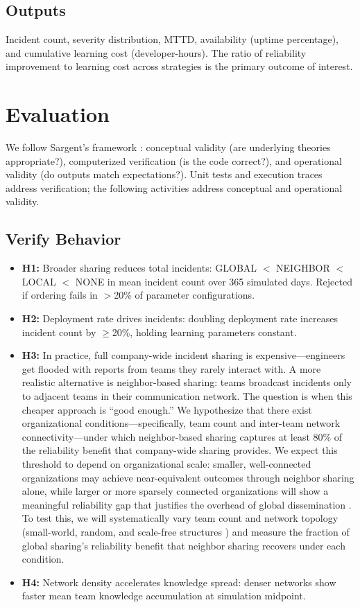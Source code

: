 \documentclass[conference,10pt]{IEEEtran}
\begin{document}
\subsection{Outputs}

Incident count, severity distribution, MTTD, availability (uptime percentage), and cumulative learning cost (developer-hours). The ratio of reliability improvement to learning cost across strategies is the primary outcome of interest.

\section{Evaluation}

We follow Sargent's framework \cite{sargent2020}: conceptual validity (are underlying theories appropriate?), computerized verification (is the code correct?), and operational validity (do outputs match expectations?). Unit tests and execution traces address verification; the following activities address conceptual and operational validity.

\subsection{Verify Behavior}

\begin{itemize}
    \item \textbf{H1:} Broader sharing reduces total incidents: GLOBAL $<$ NEIGHBOR $<$ LOCAL $<$ NONE in mean incident count over 365 simulated days. Rejected if ordering fails in $>$20\% of parameter configurations.
    \item \textbf{H2:} Deployment rate drives incidents: doubling deployment rate increases incident count by $\geq$20\%, holding learning parameters constant.
    \item \textbf{H3:} In practice, full company-wide incident sharing is expensive---engineers get flooded with reports from teams they rarely interact with. A more realistic alternative is neighbor-based sharing: teams broadcast incidents only to adjacent teams in their communication network. The question is when this cheaper approach is ``good enough.'' We hypothesize that there exist organizational conditions---specifically, team count and inter-team network connectivity---under which neighbor-based sharing captures at least 80\% of the reliability benefit that company-wide sharing provides. We expect this threshold to depend on organizational scale: smaller, well-connected organizations may achieve near-equivalent outcomes through neighbor sharing alone, while larger or more sparsely connected organizations will show a meaningful reliability gap that justifies the overhead of global dissemination \cite{nooteboom2007}. To test this, we will systematically vary team count and network topology (small-world, random, and scale-free structures \cite{watts1998, barabasi1999}) and measure the fraction of global sharing's reliability benefit that neighbor sharing recovers under each condition.
    \item \textbf{H4:} Network density accelerates knowledge spread: denser networks show faster mean team knowledge accumulation at simulation midpoint.
\end{itemize}
\end{document}
